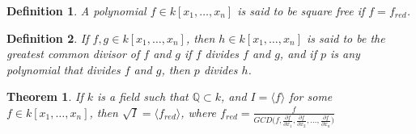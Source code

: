 \documentclass{article}
\theoremstyle{mystyle}
\newtheorem{theorem}{Theorem}[section]
\newtheorem{definition}{Definition}[section]
\begin{document}
\begin{definition}
A polynomial $f\in k[x_1,\hdots ,x_n]$ is said to be square free if $f = f_{red}$.
\end{definition}
\begin{definition}
If $f,g\in k[x_1,\hdots ,x_n]$, then $h\in k[x_1,\hdots ,x_n]$ is said to be the greatest common divisor of $f$ and $g$ if $f$ divides $f$ and $g$, and if $p$ is any polynomial that divides $f$ and $g$, then $p$ divides $h$.
\end{definition}
\begin{theorem}
If $k$ is a field such that $\mathbb{Q} \subset k$, and $I = \langle f\rangle$ for some $f\in k[x_1,\hdots ,x_n]$, then $\sqrt{I} = \langle f_{red}\rangle$, where $f_{red} = \frac{f}{GCD\big(f, \frac{\partial f}{\partial x_1}, \frac{\partial f}{\partial x_2}, \hdots, \frac{\partial f}{\partial x_n}\big)}$
\end{theorem}
\end{document}
